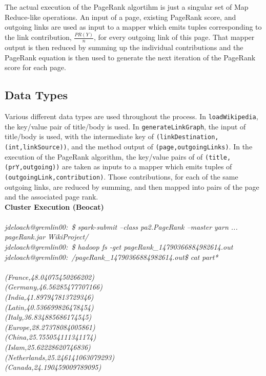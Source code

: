 \documentclass{article}
\begin{document}
The actual execution of the PageRank algortihm is just a singular set of Map Reduce-like operations.
An input of a page, existing PageRank score, and outgoing links are used as input to a mapper which emits tuples corresponding to the link contribution, $\frac{PR(Y)}{n}$, for every outgoing link of this page.
That mapper output is then reduced by summing up the individual contributions and the PageRank equation is then used to generate the next iteration of the PageRank score for each page.

\subsection{Data Types}
Various different data types are used throughout the process. In \texttt{loadWikipedia}, the key/value pair of title/body is used.
In \texttt{generateLinkGraph}, the input of title/body is used, with the intermediate key of \texttt{(linkDestination,(int,linkSource))}, and the method output of \texttt{(page,outgoingLinks)}.
In the execution of the PageRank algorithm, the key/value pairs of of \texttt{(title,(prY,outgoing))} are taken as inputs to a mapper which emits tuples of \texttt{(outgoingLink,contribution)}. Those contributions, for each of the same outgoing links, are reduced by summing, and then mapped into pairs of the page and the associated page rank. \\

\noindent
\textbf{Cluster Execution (Beocat)} \\ \\
\noindent
\textit{jdeloach@gremlin00:~\$ spark-submit --class pa2.PageRank --master yarn ... pageRank.jar WikiProject/ \\
jdeloach@gremlin00:~\$ hadoop fs -get pageRank\_14790366884982614.out \\
jdeloach@gremlin00:~/pageRank\_14790366884982614.out\$ cat part* \\ \\
(France,48.04075450266202) \\
(Germany,46.56285477707166) \\
(India,41.897947813729346) \\
(Latin,40.536699826478454) \\
(Italy,36.834885686174545) \\
(Europe,28.27378084005861) \\
(China,25.755054111341174) \\
(Islam,25.62228620746836) \\
(Netherlands,25.246141063079293) \\
(Canada,24.190459009789095)} \\
\end{document}
